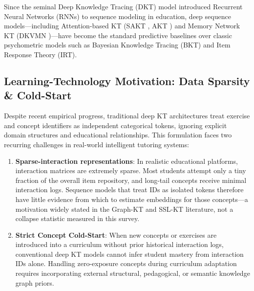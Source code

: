 \documentclass[lettersize,journal]{IEEEtran}
\begin{document}
Since the seminal Deep Knowledge Tracing (DKT) model \cite{Piech_DKT_2015} introduced Recurrent Neural Networks (RNNs) to sequence modeling in education, deep sequence models---including Attention-based KT (SAKT \cite{Pandey_SAKT_2019}, AKT \cite{Ghosh_AKT_2020}) and Memory Network KT (DKVMN \cite{Zhang_DKVMN_2017})---have become the standard predictive baselines over classic psychometric models such as Bayesian Knowledge Tracing (BKT) and Item Response Theory (IRT).

\subsection{Learning-Technology Motivation: Data Sparsity \& Cold-Start}
Despite recent empirical progress, traditional deep KT architectures treat exercise and concept identifiers as independent categorical tokens, ignoring explicit domain structures and educational relationships. This formulation faces two recurring challenges in real-world intelligent tutoring systems:
\begin{enumerate}
    \item \textbf{Sparse-interaction representations}: In realistic educational platforms, interaction matrices are extremely sparse. Most students attempt only a tiny fraction of the overall item repository, and long-tail concepts receive minimal interaction logs. Sequence models that treat IDs as isolated tokens therefore have little evidence from which to estimate embeddings for those concepts---a motivation widely stated in the Graph-KT and SSL-KT literature, not a collapse statistic measured in this survey.
    \item \textbf{Strict Concept Cold-Start}: When new concepts or exercises are introduced into a curriculum without prior historical interaction logs, conventional deep KT models cannot infer student mastery from interaction IDs alone. Handling zero-exposure concepts during curriculum adaptation requires incorporating external structural, pedagogical, or semantic knowledge graph priors.
\end{enumerate}
\end{document}
